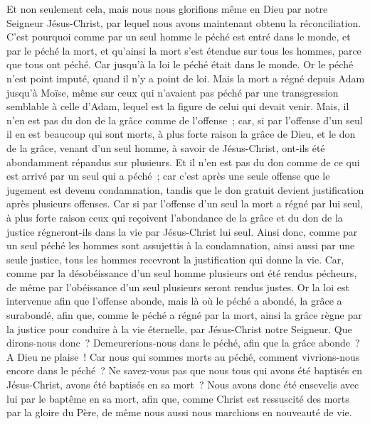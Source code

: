\begin{multicols}{2}
Et non seulement cela, mais nous nous glorifions même en Dieu par notre Seigneur Jésus-Christ, par lequel nous avons maintenant obtenu la réconciliation.
C'est pourquoi comme par un seul homme le péché est entré dans le monde, et par le péché la mort, et qu'ainsi la mort s'est étendue sur tous les hommes, parce que tous ont péché.
Car jusqu'à la loi le péché était dans le monde. Or le péché n'est point imputé, quand il n'y a point de loi.
Mais la mort a régné depuis Adam jusqu'à Moïse, même sur ceux qui n'avaient pas péché par une transgression semblable à celle d'Adam, lequel est la figure de celui qui devait venir.
Mais, il n'en est pas du don de la grâce comme de l'offense~; car, si par l'offense d'un seul il en est beaucoup qui sont morts, à plus forte raison la grâce de Dieu, et le don de la grâce, venant d'un seul homme, à savoir de Jésus-Christ, ont-ils été abondamment répandus sur plusieurs.
Et il n'en est pas du don comme de ce qui est arrivé par un seul qui a péché~; car c'est après une seule offense que le jugement est devenu condamnation, tandis que le don gratuit devient justification après plusieurs offenses.
Car si par l'offense d'un seul la mort a régné par lui seul, à plus forte raison ceux qui reçoivent l'abondance de la grâce et du don de la justice régneront-ils dans la vie par Jésus-Christ lui seul.
Ainsi donc, comme par un seul péché les hommes sont assujettis à la condamnation, ainsi aussi par une seule justice, tous les hommes recevront la justification qui donne la vie.
Car, comme par la désobéissance d'un seul homme plusieurs ont été rendus pécheurs, de même par l'obéissance d'un seul plusieurs seront rendus justes.
Or la loi est intervenue afin que l'offense abonde, mais là où le péché a abondé, la grâce a surabondé,
afin que, comme le péché a régné par la mort, ainsi la grâce règne par la justice pour conduire à la vie éternelle, par Jésus-Christ notre Seigneur.
\VerseOne{}Que dirons-nous donc~? Demeurerions-nous dans le péché, afin que la grâce abonde~?
A Dieu ne plaise~! Car nous qui sommes morts au péché, comment vivrions-nous encore dans le péché~?
Ne savez-vous pas que nous tous qui avons été baptisés en Jésus-Christ, avons été baptisés en sa mort~?
Nous avons donc été ensevelis avec lui par le baptême en sa mort, afin que, comme Christ est ressuscité des morts par la gloire du Père, de même nous aussi nous marchions en nouveauté de vie.

\end{multicols}
